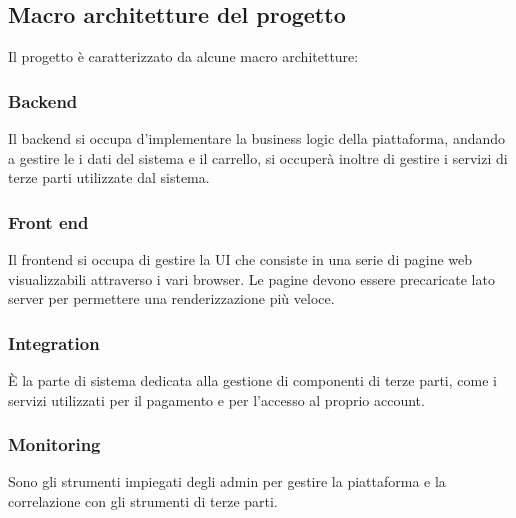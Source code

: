 \subsection{Macro architetture del progetto}
Il progetto è caratterizzato da alcune macro architetture:
\subsubsection{Backend}
Il backend si occupa d'implementare la business logic della piattaforma, andando a gestire le i dati del sistema e il carrello, si occuperà inoltre di gestire i servizi di terze parti utilizzate dal sistema.
\subsubsection{Front end}
Il frontend si occupa di gestire la UI che consiste in una serie di pagine web visualizzabili attraverso i vari browser. Le pagine devono essere precaricate lato server per permettere una renderizzazione più veloce.
\subsubsection{Integration}
È la parte di sistema dedicata alla gestione di componenti di terze parti, come i servizi utilizzati per il pagamento e per l'accesso al proprio account.
\subsubsection{Monitoring}
Sono gli strumenti impiegati degli admin per gestire la piattaforma e la correlazione con gli strumenti di terze parti.






